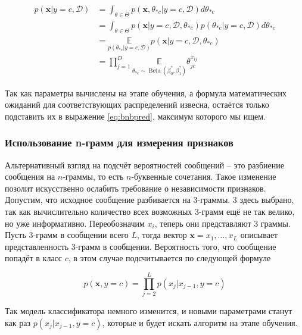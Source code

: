 \begin{align}
  p(\mathbf{x}|y=c,\mathcal{D}) &=\int_{\theta\in\Theta}p(\mathbf{x},\theta_{*c}|y=c,\mathcal{D})d\theta_{*c}\label{eq:maththeta1}\\
  &=\int_{\theta\in\Theta}p(\mathbf{x}|y=c,\mathcal{D},\theta_{*c})p(\theta_{*c}|y=c,\mathcal{D})d\theta_{*c}\label{eq:maththeta2}\\
  &=\underset{p(\theta_{*c}|y=c,\mathcal{D})} {\mathbb{E}}p(\mathbf{x}|y=c,\mathcal{D},\theta_{*c})\label{eq:maththeta2}\\
  &=\prod_{j=1}^D\underset{\theta_{*c}\sim\operatorname{Beta}(\beta_0^*,\beta_1^*)}{\mathbb{E}}\theta_{jc}^{x_{ij}}
\end{align}

Так как параметры вычислены на этапе обучения, а формула математических ожиданий для
соответствующих распределений извесна, остаётся только подставить их в выражение \ref{eq:bnbpred},
максимум которого мы ищем.

\subsubsection{Использование n-грамм для измерения признаков}\label{ngram}
Альтернативный взгляд на подсчёт вероятностей сообщений -- это разбиение сообщения на $n$-граммы, то
есть $n$-буквенные сочетания. Такое изменение позолит искусственно ослабить требование о
независимости признаков. Допустим, что исходное сообщение разбивается на 3-граммы. 3 здесь выбрано,
так как вычислительно количество всех возможных 3-грамм ещё не так велико, но уже информативно.
Переобозначим $x_i$, теперь они представляют 3 граммы. Пусть 3-грамм в сообщении всего $L$, тогда
вектор $\mathbf{x} = {x_1, \ldots, x_L}$ описывает представленность 3-грамм в сообщении.
Вероятность того, что сообщение попадёт в класс $c$, в этом случае подсчитывается по следующей формуле

\begin{equation}
  p(\mathbf{x}, y=c) = \prod_{j=2}^Lp(x_j|x_{j-1},y=c)
\end{equation}

Так модель классификатора немного изменится, и новыми параметрами станут как раз
$p(x_j|x_{j-1},y=c)$, которые и будет искать алгоритм на этапе обучения.

